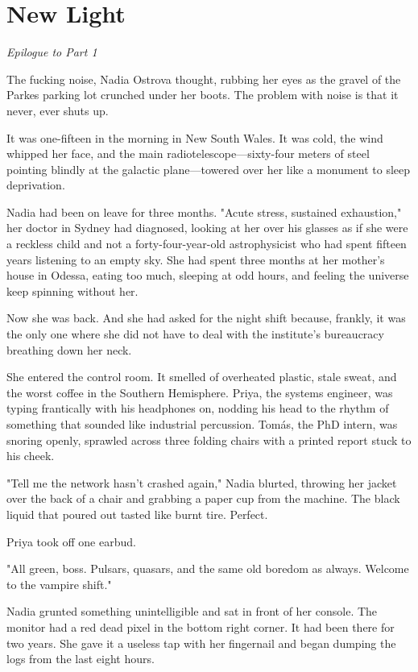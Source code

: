 \documentclass[11pt,a5paper,twoside]{book}
\begin{document}
\chapter{New Light}

\textit{Epilogue to Part 1}

The fucking noise, Nadia Ostrova thought, rubbing her eyes as the gravel of the Parkes parking lot crunched under her boots. The problem with noise is that it never, ever shuts up.

It was one-fifteen in the morning in New South Wales. It was cold, the wind whipped her face, and the main radiotelescope—sixty-four meters of steel pointing blindly at the galactic plane—towered over her like a monument to sleep deprivation.

Nadia had been on leave for three months. "Acute stress, sustained exhaustion," her doctor in Sydney had diagnosed, looking at her over his glasses as if she were a reckless child and not a forty-four-year-old astrophysicist who had spent fifteen years listening to an empty sky. She had spent three months at her mother's house in Odessa, eating too much, sleeping at odd hours, and feeling the universe keep spinning without her.

Now she was back. And she had asked for the night shift because, frankly, it was the only one where she did not have to deal with the institute’s bureaucracy breathing down her neck.

She entered the control room. It smelled of overheated plastic, stale sweat, and the worst coffee in the Southern Hemisphere. Priya, the systems engineer, was typing frantically with his headphones on, nodding his head to the rhythm of something that sounded like industrial percussion. Tomás, the PhD intern, was snoring openly, sprawled across three folding chairs with a printed report stuck to his cheek.

"Tell me the network hasn't crashed again," Nadia blurted, throwing her jacket over the back of a chair and grabbing a paper cup from the machine. The black liquid that poured out tasted like burnt tire. Perfect.

Priya took off one earbud.

"All green, boss. Pulsars, quasars, and the same old boredom as always. Welcome to the vampire shift."

Nadia grunted something unintelligible and sat in front of her console. The monitor had a red dead pixel in the bottom right corner. It had been there for two years. She gave it a useless tap with her fingernail and began dumping the logs from the last eight hours.
\end{document}
